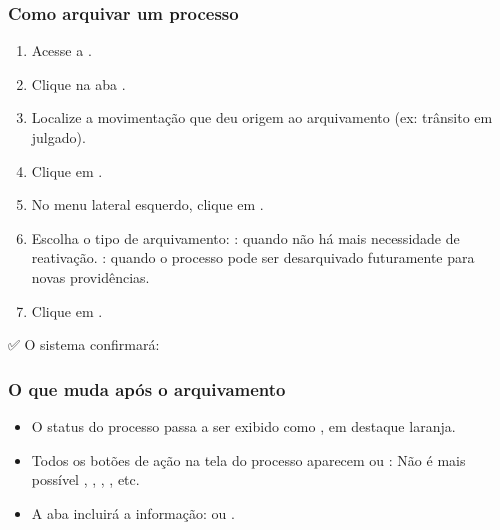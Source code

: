 \documentclass[letterpaper,10pt,brazil]{sphinxmanual}
\begin{document}
\subsubsection{Como arquivar um processo}
\label{\detokenize{projud_41_arquivamento:como-arquivar-um-processo}}\begin{enumerate}
%
\item {} 
\sphinxAtStartPar
Acesse a .

\item {} 
\sphinxAtStartPar
Clique na aba .

\item {} 
\sphinxAtStartPar
Localize a movimentação que deu origem ao arquivamento (ex: trânsito em julgado).

\item {} 
\sphinxAtStartPar
Clique em .

\item {} 
\sphinxAtStartPar
No menu lateral esquerdo, clique em .

\item {} 
\sphinxAtStartPar
Escolha o tipo de arquivamento:
\sphinxhyphen{} : quando não há mais necessidade de reativação.
\sphinxhyphen{} : quando o processo pode ser desarquivado futuramente para novas providências.

\item {} 
\sphinxAtStartPar
Clique em .

\end{enumerate}

\sphinxAtStartPar
✅ O sistema confirmará: 


\subsubsection{O que muda após o arquivamento}
\label{\detokenize{projud_41_arquivamento:o-que-muda-apos-o-arquivamento}}\begin{itemize}
\item {} 
\sphinxAtStartPar
O status do processo passa a ser exibido como , em destaque laranja.

\item {} 
\sphinxAtStartPar
Todos os botões de ação na tela do processo aparecem  ou :
\sphinxhyphen{} Não é mais possível , , , , etc.

\item {} 
\sphinxAtStartPar
A aba  incluirá a informação:  ou .

\end{itemize}
\end{document}
